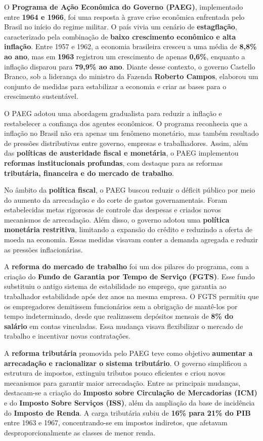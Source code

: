\documentclass[a4paper,12pt]{article}[abntex2]
\begin{document}
O \textbf{Programa de Ação Econômica do Governo (PAEG)}, implementado entre \textbf{1964 e 1966}, foi uma resposta à grave crise econômica enfrentada pelo Brasil no início do regime militar. O país vivia um cenário de \textbf{estagflação}, caracterizado pela combinação de \textbf{baixo crescimento econômico e alta inflação}. Entre 1957 e 1962, a economia brasileira cresceu a uma média de \textbf{8,8\% ao ano}, mas em \textbf{1963} registrou um crescimento de apenas \textbf{0,6\%}, enquanto a inflação disparou para \textbf{79,9\% ao ano}. Diante desse contexto, o governo Castello Branco, sob a liderança do ministro da Fazenda \textbf{Roberto Campos}, elaborou um conjunto de medidas para estabilizar a economia e criar as bases para o crescimento sustentável.

O PAEG adotou uma abordagem gradualista para reduzir a inflação e restabelecer a confiança dos agentes econômicos. O programa reconhecia que a inflação no Brasil não era apenas um fenômeno monetário, mas também resultado de pressões distributivas entre governo, empresas e trabalhadores. Assim, além das \textbf{políticas de austeridade fiscal e monetária}, o PAEG implementou \textbf{reformas institucionais profundas}, com destaque para as reformas \textbf{tributária, financeira e do mercado de trabalho}.

No âmbito da \textbf{política fiscal}, o PAEG buscou reduzir o déficit público por meio do aumento da arrecadação e do corte de gastos governamentais. Foram estabelecidas metas rigorosas de controle das despesas e criados novos mecanismos de arrecadação. Além disso, o governo adotou uma \textbf{política monetária restritiva}, limitando a expansão do crédito e reduzindo a oferta de moeda na economia. Essas medidas visavam conter a demanda agregada e reduzir as pressões inflacionárias.

A \textbf{reforma do mercado de trabalho} foi um dos pilares do programa, com a criação do \textbf{Fundo de Garantia por Tempo de Serviço (FGTS)}. Esse fundo substituiu o antigo sistema de estabilidade no emprego, que garantia ao trabalhador estabilidade após dez anos na mesma empresa. O FGTS permitiu que os empregadores demitissem funcionários sem a obrigação de mantê-los por tempo indeterminado, desde que realizassem depósitos mensais de \textbf{8\% do salário} em contas vinculadas. Essa mudança visava flexibilizar o mercado de trabalho e incentivar novas contratações.

A \textbf{reforma tributária} promovida pelo PAEG teve como objetivo \textbf{aumentar a arrecadação e racionalizar o sistema tributário}. O governo simplificou a estrutura de impostos, extinguiu tributos pouco eficientes e criou novos mecanismos para garantir maior arrecadação. Entre as principais mudanças, destacam-se a criação do \textbf{Imposto sobre Circulação de Mercadorias (ICM)} e do \textbf{Imposto Sobre Serviços (ISS)}, além da ampliação da base de incidência do \textbf{Imposto de Renda}. A carga tributária subiu de \textbf{16\% para 21\% do PIB} entre 1963 e 1967, concentrando-se em impostos indiretos, que afetavam desproporcionalmente as classes de menor renda.
\end{document}
